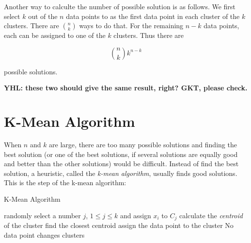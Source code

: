 Another way to calculte the number of possible solution is as follows.
We first select $k$ out of the $n$ data points to as the first data
point in each cluster of the $k$ clusters. There are $\binom{n}{k}$
ways to do that.  For the remaining $n-k$ data points, each can be
assigned to one of the $k$ clusters. Thus there are

\begin{equation}
  \binom{n}{k} k^{n-k}
\end{equation}

possible solutions.

{\bf YHL: these two should give the same result, right? GKT, please check.}




\section{K-Mean Algorithm}

When $n$ and $k$ are large, there are too many possible solutions and
finding the best solution (or one of the best solutions, if several
solutions are equally good and better than the other solutions) would
be difficult. Instead of find the best solution, a heuristic, called
the {\it k-mean algorithm}, usually finds good solutions.  This is the
step of the k-mean algorithm:


\begin{algorithm}
    \caption[]{K-Mean Algorithm}
    \begin{algorithmic}[1]
      randomly select a number $j$, $1 \le j \le k$ and assign
      $x_i$ to $C_j$
      \EndFor
      \Repeat 
      \State
      calculate the {\it centroid} of the cluster
      \EndFor
      \State find the closest centroid
      \State assign the data point to  the cluster
      \EndFor
      \Until No data point changes clusters
    \end{algorithmic}
\end{algorithm}

